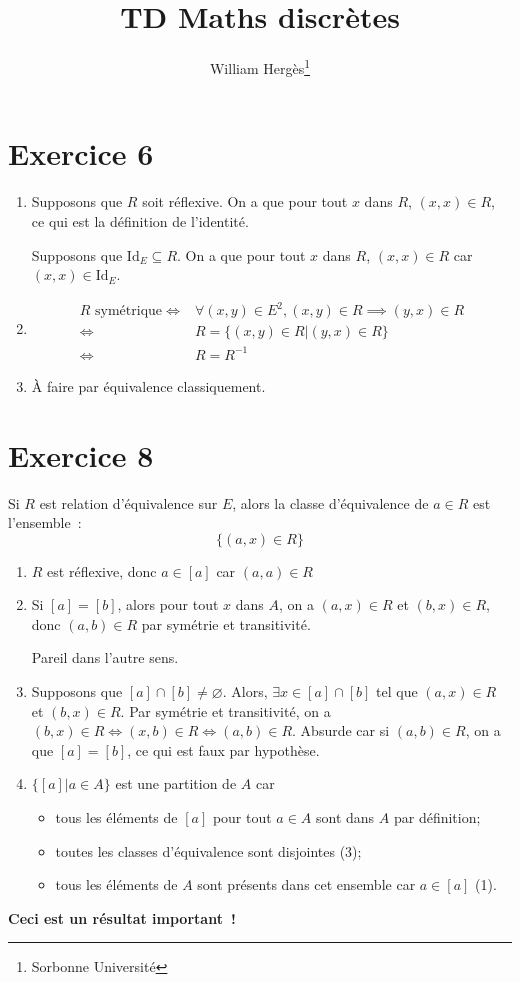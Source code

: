 \documentclass[a4paper]{article}
\title{TD Maths discrètes}
\author{William Hergès\thanks{Sorbonne Université}}
\begin{document}
	\maketitle
    \section*{Exercice 6}
    \begin{enumerate}
        \item Supposons que $R$ soit réflexive.
            On a que pour tout $x$ dans $R$, $(x,x)\in R$, ce qui est la définition de l'identité.

            Supposons que $\mathrm{Id}_E\subseteq R$.
            On a que pour tout $x$ dans $R$, $(x,x)\in R$ car $(x,x)\in\mathrm{Id}_E$.
        \item \begin{align*}
                \text{$R$ symétrique} \iff& \forall (x,y)\in E^2, (x,y)\in R \implies (y,x)\in R \\
                                      \iff& R = \{(x,y) \in R | (y,x)\in R \} \\
                                      \iff& R = R^{-1} 
            \end{align*}
        \item À faire par équivalence classiquement. 
    \end{enumerate}
    \section*{Exercice 8}
    Si $R$ est relation d'équivalence sur $E$, alors la classe d'équivalence de $a\in R$ est l'ensemble~:
    $$ \{(a,x)\in R\} $$
    \begin{enumerate}
        \item $R$ est réflexive, donc $a\in [a]$ car $(a,a)\in R$
        \item Si $[a] = [b]$, alors pour tout $x$ dans $A$, on a $(a,x)\in R$ et $(b,x)\in R$, donc $(a,b)\in R$ par
            symétrie et transitivité.

            Pareil dans l'autre sens.
        \item Supposons que $[a]\cap[b]\neq\varnothing$. 
            Alors, $\exists x\in [a]\cap[b]$ tel que $(a,x)\in R$ et $(b,x)\in R$.
            Par symétrie et transitivité, on a $(b,x)\in R \iff (x,b)\in R \iff (a,b)\in R$.
            Absurde car si $(a,b)\in R$, on a que $[a] = [b]$, ce qui est faux par hypothèse.
        \item $\{[a]|a\in A\}$ est une partition de $A$ car 
            \begin{itemize}
                \item tous les éléments de $[a]$ pour tout $a\in A$ sont dans $A$ par définition;
                \item toutes les classes d'équivalence sont disjointes (3);
                \item tous les éléments de $A$ sont présents dans cet ensemble car $a\in [a]$ (1).
            \end{itemize}
    \end{enumerate}
    \textbf{Ceci est un résultat important~!}
\end{document}
